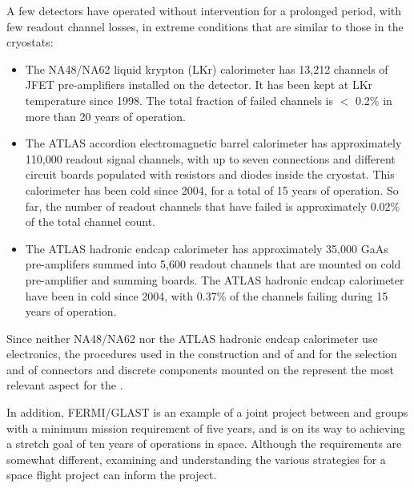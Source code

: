 A few  detectors have operated without intervention for a 
prolonged period, with few readout channel losses, in extreme 
conditions that are similar to those in the   cryostats:
\begin{itemize}
\item The NA48/NA62 liquid krypton (LKr) calorimeter has 13,212 channels 
of JFET pre-amplifiers installed on the detector. It has been kept at LKr temperature 
since 1998. The total fraction of failed channels is $<$ 0.2\% in more than \num{20} years of operation.
\item The ATLAS  accordion electromagnetic barrel calorimeter has 
approximately 110,000 readout signal channels, with up to seven connections and different 
circuit boards populated with resistors and diodes inside the cryostat. This
calorimeter has been cold since 2004, for a total of \num{15} years of operation. So far, the
number of readout channels that have failed is approximately 0.02\% of the total channel count.
\item The ATLAS  hadronic endcap calorimeter has approximately 35,000 GaAs
pre-amplifers summed into 5,600 readout channels that are mounted on cold pre-amplifier
and summing boards. The ATLAS  hadronic endcap 
calorimeter  have been in cold since 2004, with
0.37\% of the channels failing during 15 years of operation. 
\end{itemize}
Since neither NA48/NA62 nor the ATLAS  hadronic endcap calorimeter
use  electronics, the procedures used in the construction and  of  and 
for the selection and  of connectors and discrete components mounted
on the  represent the most relevant aspect for the  .

In addition, FERMI/GLAST is an example of a joint project between  and  groups 
with a minimum mission requirement of five years, and is on its way to achieving a 
stretch goal of ten years of operations in space. Although the requirements are somewhat 
different, examining and understanding the various strategies for a space 
flight project can inform the  project. 

